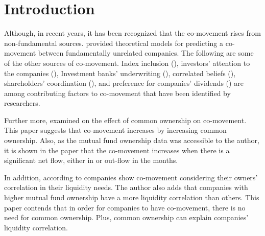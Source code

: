 \section{Introduction}
\begin{LTR}
	
	Although, in recent years, it has been recognized that the co-movement rises from non-fundamental sources.  provided theoretical models for predicting a co-movement between fundamentally unrelated companies.
	The following are some of the other sources of co-movement. Index inclusion (), investors' attention to the companies (), Investment banks' underwriting (), correlated beliefs (), shareholders' coordination (), and preference for companies' dividends () are among contributing factors to co-movement that have been identified by researchers.
	
	
	Further more,  examined on the effect of common ownership on co-movement. 
	This paper suggests that co-movement increases by increasing common ownership. Also, as the mutual fund ownership data was accessible to the author, it is shown in the paper that the  co-movement increases when there is a significant net flow, either in or out-flow in the months.
	
	In addition, according to  companies show co-movement considering their owners' correlation in their liquidity needs. The author also adds that companies with higher mutual fund ownership have a more liquidity correlation than others. This paper contends that in order for companies to have co-movement, there is no need for common ownership. Plus, common ownership can explain companies'  liquidity correlation. 
\end{LTR}



